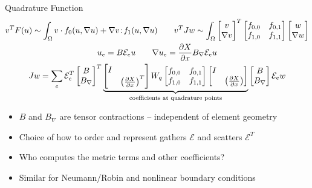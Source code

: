 \documentclass[aspectratio=169]{beamer}
\begin{document}
\begin{frame}{Quadrature Function}
  \begin{gather*}
    v^T F(u) \sim \int_\Omega v \cdot f_0(u, \nabla u) + \nabla v \!:\! f_1(u, \nabla u) \qquad
    v^T J w \sim \int_\Omega \begin{bmatrix} v \\ \nabla v \end{bmatrix}^T \begin{bmatrix} f_{0,0} & f_{0,1} \\ f_{1,0} & f_{1,1} \end{bmatrix} \begin{bmatrix} w \\ \nabla w \end{bmatrix} \\
    u_e = B \mathcal E_e u \qquad \nabla u_e = \frac{\partial X}{\partial x} B_{\nabla} \mathcal E_e u \\
    J w = \sum_e \mathcal E_e^T \begin{bmatrix} B \\ B_{\nabla} \end{bmatrix}^T
    \underbrace{\begin{bmatrix} I & \\ & \left( \frac{\partial X}{\partial x}\right)^T \end{bmatrix} W_q \begin{bmatrix} f_{0,0} & f_{0,1} \\ f_{1,0} & f_{1,1} \end{bmatrix} \begin{bmatrix} I & \\ & \left( \frac{\partial X}{\partial x}\right) \end{bmatrix}}_{\text{coefficients at quadrature points}} \begin{bmatrix} B \\ B_{\nabla} \end{bmatrix} \mathcal E_e w 
  \end{gather*}
  \begin{itemize}
  \item $B$ and $B_\nabla$ are tensor contractions -- independent of element geometry
  \item Choice of how to order and represent gathers $\mathcal E$ and scatters $\mathcal E^T$
  \item Who computes the metric terms and other coefficients?
  \item Similar for Neumann/Robin and nonlinear boundary conditions
  \end{itemize}
\end{frame}
\end{document}
